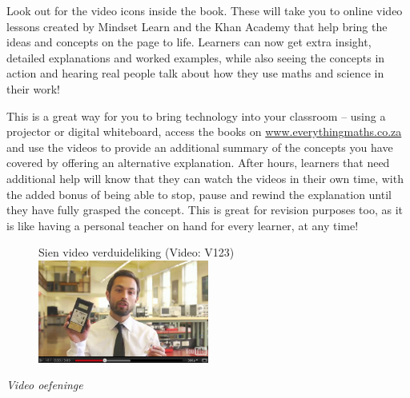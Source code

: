 {\Large

Look out for the video icons inside the book. These will take you to online video lessons created by Mindset
Learn and the Khan Academy that help bring the ideas and concepts on the page to life. Learners can now get extra insight, detailed
explanations and worked examples, while also seeing the concepts in action and hearing real people talk about how they use maths and science in their work!  \par

This is a great way for you to bring technology into your classroom – using a projector or digital whiteboard, access the books on \underline{www.everythingmaths.co.za} and use the videos to provide an additional summary of the concepts you have covered by offering an alternative explanation. After hours, learners that need additional help will know that they can watch the videos in their own time, with the added bonus of being able to stop, pause and rewind the explanation until they have fully grasped the concept. This is great for revision purposes too, as it is like having a personal teacher on hand for every learner, at any time! \par
\begin{figure}[h]
\begin{center}
Sien video verduideliking  (Video: V123)\\
\includegraphics[width=0.5\textwidth]{../title_images/veritasiumvideo.png}
\end{center}
\end{figure}

}


\vspace{0.5cm}
{\normalfont\sffamily\fontsize{22}\normalfont\itshape Video oefeninge} \par

